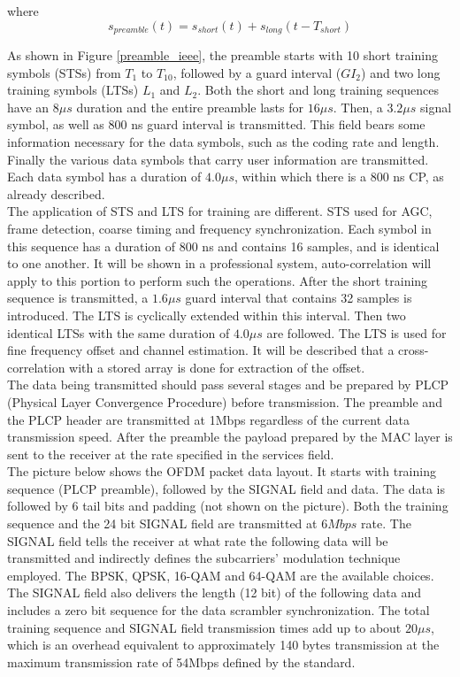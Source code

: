 where\\
\begin{equation} \label{preamble_ofdm}
s_{preamble}(t)= s_{short}(t)+ s_{long}(t- T_{short})
\end{equation}

As shown in Figure \ref{preamble_ieee}, the preamble starts with 10 short training symbols (STSs) from $T_{1}$ to $T_{10}$, followed by a guard interval ($GI_{2}$) and two long training symbols (LTSs) $L_{1}$ and $L_{2}$. Both the short and long training sequences have an $8 \mu s$ duration and the entire preamble lasts for $16 \mu s$. Then, a $3.2 \mu s$ signal symbol, as well as 800 ns guard interval is transmitted. This field bears some information necessary for the data symbols, such as the coding rate and length. Finally the various data symbols that carry user information are transmitted. Each data symbol has a duration of $4.0 \mu s$, within which there is a 800 ns CP, as already described.\\
The application of STS and LTS for training are different. STS used for AGC, frame detection, coarse timing and frequency synchronization. Each symbol in this sequence has a duration of 800 ns and contains 16 samples, and is identical to one another.
 It will be shown in a professional system, auto-correlation will apply to this portion to perform such the operations. After the short training sequence is transmitted, a $1.6 \mu s$ guard interval that contains 32 samples is introduced. The LTS is cyclically extended within this interval. Then two identical LTSs with the same duration of $4.0 \mu s$ are followed. The LTS is used for fine frequency offset and channel estimation. It will be described that a cross-correlation with a stored array is done for extraction of the offset.\\
The data being transmitted should pass several stages and be prepared by PLCP (Physical Layer Convergence Procedure) before transmission. The preamble and the PLCP header are transmitted at 1Mbps regardless of the current data transmission speed. After the preamble the payload prepared by the MAC layer is sent to the receiver at the rate specified in the services field.\\
The picture below shows the OFDM packet data layout. It starts with training sequence (PLCP preamble), followed by the SIGNAL field and data. The data is followed by 6 tail bits and padding (not shown on the picture). Both the training sequence and the 24 bit SIGNAL field are transmitted at $6 Mbps$ rate. The SIGNAL field tells the receiver at what rate the following data will be transmitted and indirectly defines the subcarriers' modulation technique employed. The BPSK, QPSK, 16-QAM and 64-QAM are the available choices. The SIGNAL field also delivers the length (12 bit) of the following data and includes a zero bit sequence for the data scrambler synchronization. The total training sequence and SIGNAL field transmission times add up to about $20 \mu s$, which is an overhead equivalent to approximately 140 bytes transmission at the maximum transmission rate of 54Mbps defined by the standard.\\

